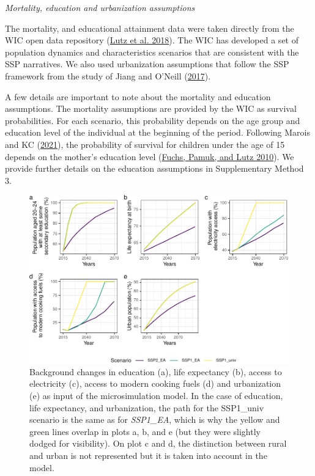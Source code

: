 \documentclass[
]{article}
\begin{document}
\newpage

\emph{Mortality, education and urbanization assumptions}

The mortality, and educational attainment data were taken directly from the WIC open data repository (\protect\hyperlink{ref-lutz_demographic_2018}{Lutz et al. 2018}). The WIC has developed a set of population dynamics and characteristics scenarios that are consistent with the SSP narratives. We also used urbanization assumptions that follow the SSP framework from the study of Jiang and O'Neill (\protect\hyperlink{ref-jiang_global_2017}{2017}).

A few details are important to note about the mortality and education assumptions. The mortality assumptions are provided by the WIC as survival probabilities. For each scenario, this probability depends on the age group and education level of the individual at the beginning of the period. Following Marois and KC (\protect\hyperlink{ref-marois_microsimulation_2021}{2021}), the probability of survival for children under the age of 15 depends on the mother's education level (\protect\hyperlink{ref-fuchs_education_2010}{Fuchs, Pamuk, and Lutz 2010}). We provide further details on the education assumptions in Supplementary Method 3.

\begin{figure}
\centering
\includegraphics{../figures/input-1.pdf}
\caption{\label{fig:input}Background changes in education (a), life expectancy (b), access to electricity (c), access to modern cooking fuels (d) and urbanization (e) as input of the microsimulation model. In the case of education, life expectancy, and urbanization, the path for the SSP1\_univ scenario is the same as for \emph{SSP1\_EA}, which is why the yellow and green lines overlap in plots a, b, and e (but they were slightly dodged for visibility). On plot c and d, the distinction between rural and urban is not represented but it is taken into account in the model.}
\end{figure}
\end{document}
